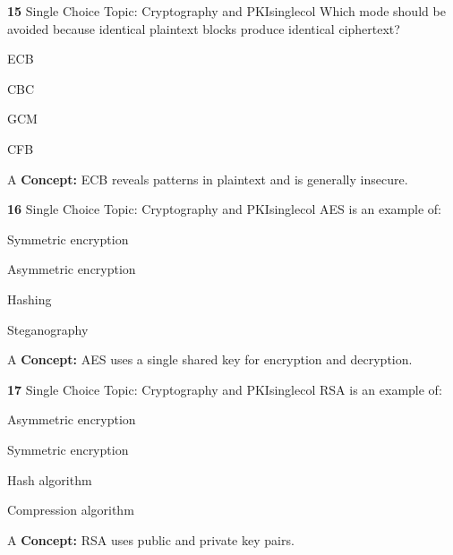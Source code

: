 \documentclass[10pt,a4paper]{article}
\begin{document}
\begin{qcard}{\color{white}\textbf{15} \hfill \small Single Choice \textbar{} Topic: Cryptography and PKI}{singlecol}
Which mode should be avoided because identical plaintext blocks produce identical ciphertext?

\begin{qoptions}
\item ECB
\item CBC
\item GCM
\item CFB
\end{qoptions}
\begin{explainbox}{A}
\textbf{Concept:} ECB reveals patterns in plaintext and is generally insecure.
\end{explainbox}
\end{qcard}

\begin{qcard}{\color{white}\textbf{16} \hfill \small Single Choice \textbar{} Topic: Cryptography and PKI}{singlecol}
AES is an example of:

\begin{qoptions}
\item Symmetric encryption
\item Asymmetric encryption
\item Hashing
\item Steganography
\end{qoptions}
\begin{explainbox}{A}
\textbf{Concept:} AES uses a single shared key for encryption and decryption.
\end{explainbox}
\end{qcard}

\begin{qcard}{\color{white}\textbf{17} \hfill \small Single Choice \textbar{} Topic: Cryptography and PKI}{singlecol}
RSA is an example of:

\begin{qoptions}
\item Asymmetric encryption
\item Symmetric encryption
\item Hash algorithm
\item Compression algorithm
\end{qoptions}
\begin{explainbox}{A}
\textbf{Concept:} RSA uses public and private key pairs.
\end{explainbox}
\end{qcard}
\end{document}
